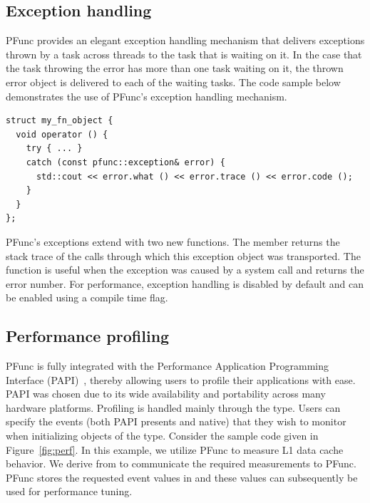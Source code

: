 \documentclass{sig-alternate}
\begin{document}
\subsection{Exception handling}
\label{sec:exceptions}
PFunc provides an elegant exception handling mechanism that delivers exceptions
thrown by a task across threads to the task that is waiting on it. In the case
that the task throwing the error has more than one task waiting on it, the
thrown error object is delivered to each of the waiting tasks. The code sample
below demonstrates the use of PFunc's exception handling mechanism.

\begin{lstlisting}
struct my_fn_object { 
  void operator () { 
    try { ... }
    catch (const pfunc::exception& error) { 
      std::cout << error.what () << error.trace () << error.code (); 
    } 
  }
};
\end{lstlisting}

PFunc's exceptions extend  with two new functions. The
member  returns the stack trace of the calls through
which this exception object was transported. The function
 is useful when the exception was caused by a system call
and returns the error number.  For performance, exception handling is
disabled by default and can be enabled using a compile time flag. 

\subsection{Performance profiling}
\label{sec:performance}
PFunc is fully integrated with the Performance Application Programming
Interface (PAPI)~\cite{papi}, thereby allowing users to profile their
applications with ease. PAPI was chosen due to its wide availability and
portability across many hardware platforms. Profiling is handled mainly through
the  type. Users can specify the events (both PAPI presents and
native) that they wish to monitor when initializing objects of the
 type. Consider the sample code given in Figure~\ref{fig:perf}.
In this example, we utilize PFunc to measure L1 data cache behavior. We
derive from  to communicate the required
measurements to PFunc. PFunc stores the requested event values in
 and these values can subsequently be used for performance
tuning.
\end{document}
